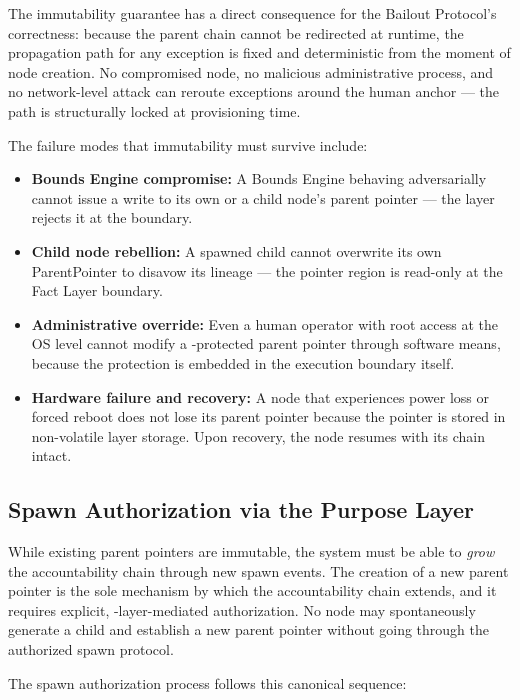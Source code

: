 The immutability guarantee has a direct consequence for the Bailout Protocol's correctness: because the parent chain cannot be redirected at runtime, the propagation path for any exception is fixed and deterministic from the moment of node creation. No compromised node, no malicious administrative process, and no network-level attack can reroute exceptions around the human anchor — the path is structurally locked at provisioning time.

The failure modes that immutability must survive include:

\begin{itemize}
\item \textbf{Bounds Engine compromise:} A Bounds Engine behaving adversarially cannot issue a write to its own or a child node's parent pointer — the \fact{} layer rejects it at the boundary.
\item \textbf{Child node rebellion:} A spawned child cannot overwrite its own ParentPointer to disavow its lineage — the pointer region is read-only at the Fact Layer boundary.
\item \textbf{Administrative override:} Even a human operator with root access at the OS level cannot modify a \fact{}-protected parent pointer through software means, because the protection is embedded in the execution boundary itself.
\item \textbf{Hardware failure and recovery:} A node that experiences power loss or forced reboot does not lose its parent pointer because the pointer is stored in non-volatile \fact{} layer storage. Upon recovery, the node resumes with its chain intact.
\end{itemize}

\subsection{Spawn Authorization via the Purpose Layer}

While existing parent pointers are immutable, the system must be able to \emph{grow} the accountability chain through new spawn events. The creation of a new parent pointer is the sole mechanism by which the accountability chain extends, and it requires explicit, \purpose{}-layer-mediated authorization. No node may spontaneously generate a child and establish a new parent pointer without going through the authorized spawn protocol.

The spawn authorization process follows this canonical sequence:

